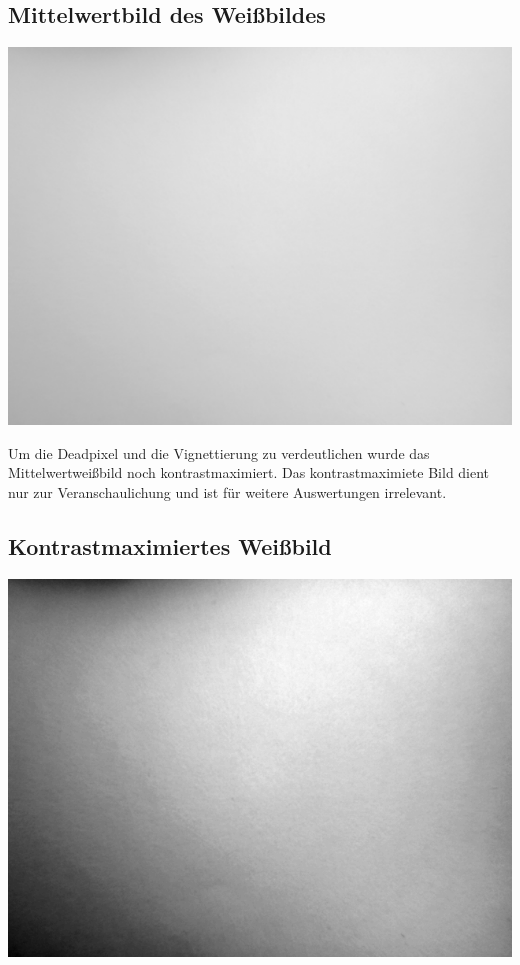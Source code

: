 \subsection*{Mittelwertbild des Weißbildes}
\includegraphics[scale=0.6]{media/weissMean.png}

Um die Deadpixel und die Vignettierung zu verdeutlichen wurde das Mittelwertweißbild noch kontrastmaximiert. Das kontrastmaximiete Bild dient nur zur Veranschaulichung und ist für weitere Auswertungen irrelevant.

\subsection*{Kontrastmaximiertes Weißbild}
\includegraphics[scale=0.6]{media/weissContrastMax.png}

